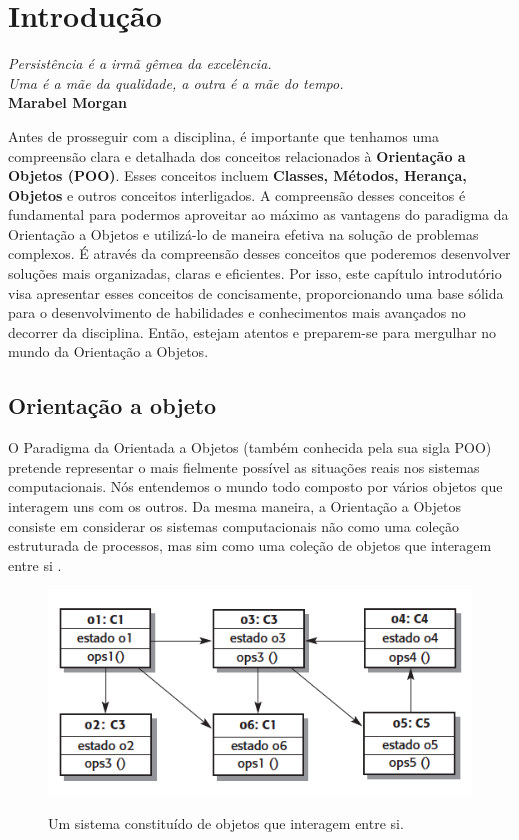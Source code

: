 \chapter{Introdução}\label{cap:cap1}

\begin{flushright}
  \textit{
    Persistência é a irmã gêmea da excelência. \\
    Uma é a mãe da qualidade, a outra é a mãe do tempo.
  } \\
  
  \textbf{Marabel Morgan}
\end{flushright}


Antes de prosseguir com a disciplina, é importante que tenhamos uma compreensão clara e detalhada dos conceitos relacionados à \textbf{Orientação a Objetos (POO)}. Esses conceitos incluem \textbf{Classes, Métodos, Herança, Objetos} e outros conceitos interligados. A compreensão desses conceitos é fundamental para podermos aproveitar ao máximo as vantagens do paradigma da Orientação a Objetos e utilizá-lo de maneira efetiva na solução de problemas complexos. É através da compreensão desses conceitos que poderemos desenvolver soluções mais organizadas, claras e eficientes. Por isso, este capítulo introdutório visa apresentar esses conceitos de concisamente, proporcionando uma base sólida para o desenvolvimento de habilidades e conhecimentos mais avançados no decorrer da disciplina. Então, estejam atentos e preparem-se para mergulhar no mundo da Orientação a Objetos.

\section{Orientação a objeto}

O Paradigma da Orientada a Objetos (também conhecida pela sua sigla POO) pretende representar o mais fielmente possível as situações reais nos sistemas computacionais. Nós entendemos o mundo todo composto por vários objetos que interagem uns com os outros. Da mesma maneira, a Orientação a Objetos consiste em considerar os sistemas computacionais não como uma coleção estruturada de processos, mas sim como uma coleção de objetos que interagem entre si \cite{farinelli2007conceitos}.

\begin{figure}[H]
	\centering
	\caption{Um sistema constituído de objetos que interagem entre si.}
	\includegraphics[scale=0.6]{imagens/figura-01.png}
	\label{fig:figura-01}
\end{figure}

